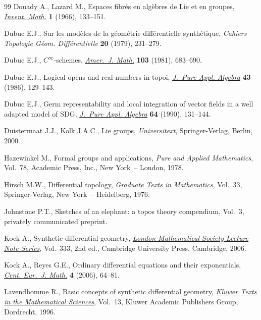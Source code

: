 \documentclass[10pt,a4paper]{amsart}
\numberwithin{equation}{section}
\begin{document}
\begin{thebibliography}{99}
Douady A., Lazard M., Espaces f\/ibr\'es en alg\`ebres de {L}ie et en groupes,
 \href{https://doi.org/10.1007/BF01389725}{\textit{Invent. Math.}} \textbf{1} (1966), 133--151.

Dubuc E.J., Sur les mod\`eles de la g\'eom\'etrie dif\/f\'erentielle
 synth\'etique, \textit{Cahiers Topologie G\'eom. Diff\'erentielle}
 \textbf{20} (1979), 231--279.

Dubuc E.J., {$C^{\infty }$}-schemes, \href{https://doi.org/10.2307/2374046}{\textit{Amer.~J. Math.}} \textbf{103}
 (1981), 683--690.

Dubuc E.J., Logical opens and real numbers in topoi, \href{https://doi.org/10.1016/0022-4049(86)90091-5}{\textit{J.~Pure Appl.
 Algebra}} \textbf{43} (1986), 129--143.

Dubuc E.J., Germ representability and local integration of vector f\/ields in a
 well adapted model of {SDG}, \href{https://doi.org/10.1016/0022-4049(90)90152-8}{\textit{J.~Pure Appl. Algebra}} \textbf{64}
 (1990), 131--144.

Duistermaat J.J., Kolk J.A.C., Lie groups, \href{https://doi.org/10.1007/978-3-642-56936-4}{\textit{Universitext}}, Springer-Verlag,
 Berlin, 2000.

Hazewinkel M., Formal groups and applications, \textit{Pure and Applied
 Mathematics}, Vol.~78, Academic Press, Inc., New York~-- London, 1978.

Hirsch M.W., Dif\/ferential topology, \href{https://doi.org/10.1007/978-1-4684-9449-5}{\textit{Graduate Texts in Mathematics}},
 Vol.~33, Springer-Verlag, New York~-- Heidelberg, 1976.

Johnstone P.T., Sketches of an elephant: a topos theory compendium, {V}ol.~3,
 {p}rivately communicated preprint.

Kock A., Synthetic dif\/ferential geometry, \href{https://doi.org/10.1017/CBO9780511550812}{\textit{London Mathematical Society
 Lecture Note Series}}, Vol.~333, 2nd ed., Cambridge University Press,
 Cambridge, 2006.

Kock A., Reyes G.E., Ordinary dif\/ferential equations and their exponentials,
 \href{https://doi.org/10.1007/s11533-005-0005-2}{\textit{Cent. Eur.~J. Math.}} \textbf{4} (2006), 64--81.

Lavendhomme R., Basic concepts of synthetic dif\/ferential geometry,
 \href{https://doi.org/10.1007/978-1-4757-4588-7}{\textit{Kluwer Texts in the Mathematical Sciences}}, Vol.~13, Kluwer Academic
 Publishers Group, Dordrecht, 1996.


\end{thebibliography}
\end{document}
